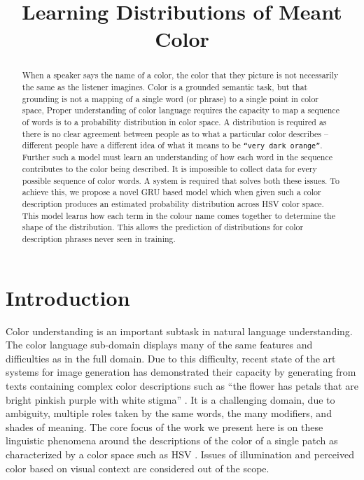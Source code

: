 \documentclass[11pt,a4paper]{article}
\title{Learning Distributions of Meant Color}
\newcommand{\parencite}{\citep}
\begin{document}
\maketitle

\begin{abstract}
When a speaker says the name of a color, the color that they picture is not necessarily the same as the listener imagines.
Color is a grounded semantic task, but that grounding is not a mapping of a single word (or phrase) to a single point in color space,
Proper understanding of color language requires the capacity to map a sequence of words is to a probability distribution in color space.
A distribution is required as there is no clear agreement between people as to what a particular color describes -- different people have a different idea of what it means to be \texttt{``very dark orange''}.
Further such a model must learn an understanding of how each word in the sequence contributes to the color being described.
It is impossible to collect data for every possible sequence of color words.
A system is required that solves both these issues.
To achieve this, we propose a novel GRU based model which when given such a color description produces an estimated probability distribution across HSV color space.
This model learns how each term in the colour name comes together to determine the shape of the distribution.
This allows the prediction of distributions for color description phrases never seen in training.
\end{abstract}

\section{Introduction}

Color understanding is an important subtask in natural language understanding.
The color language sub-domain displays many of the same features and difficulties as in the full domain.
Due to this difficulty, recent state of the art systems for image generation has demonstrated their capacity by generating from texts containing complex color descriptions such as ``the flower has petals that are bright pinkish purple with white stigma'' \parencite{reed2016generative, 2015arXiv151102793M}.
It is a challenging domain, due to ambiguity, multiple roles taken by the same words, the many modifiers, and shades of meaning.
The core focus of the work we present here is on these linguistic phenomena around the descriptions of the color of a single patch as characterized by a color space such as HSV \parencite{smith1978color}.
Issues of illumination and perceived color based on visual context are considered out of the scope.
\end{document}
